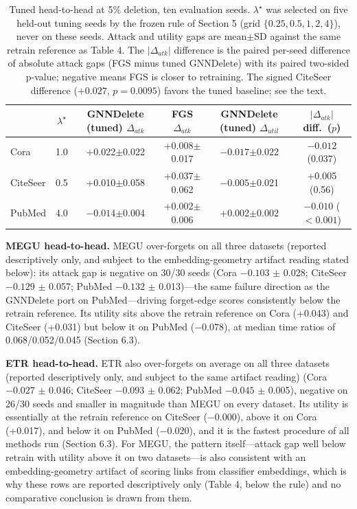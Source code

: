 \documentclass[pdflatex,sn-basic,Numbered]{sn-jnl}
\begin{document}
\begin{table}[htbp]\centering\scriptsize\setlength{\tabcolsep}{3pt}
\caption{Tuned head-to-head at 5\% deletion, ten evaluation seeds. $\lambda^\star$ was selected on five held-out tuning seeds by the frozen rule of Section 5 (grid $\{0.25, 0.5, 1, 2, 4\}$), never on these seeds. Attack and utility gaps are mean$\pm$SD against the same retrain reference as Table 4. The $|\Delta_{atk}|$ difference is the paired per-seed difference of absolute attack gaps (FGS minus tuned GNNDelete) with its paired two-sided p-value; negative means FGS is closer to retraining. The signed CiteSeer difference ($+0.027$, $p = 0.0095$) favors the tuned baseline; see the text.}
\begin{tabular}{lccccc}\toprule & $\lambda^\star$ & GNNDelete (tuned) $\Delta_{atk}$ & FGS $\Delta_{atk}$ & GNNDelete (tuned) $\Delta_{util}$ & $|\Delta_{atk}|$ diff.\ ($p$)\\\midrule
Cora & 1.0 & +0.022$\pm$0.022 & +0.008$\pm$0.017 & $-0.017$$\pm$0.022 & $-0.012$ (0.037)\\
CiteSeer & 0.5 & +0.010$\pm$0.058 & +0.037$\pm$0.062 & $-0.005$$\pm$0.021 & +0.005 (0.56)\\
PubMed & 4.0 & $-0.014$$\pm$0.004 & +0.002$\pm$0.006 & +0.002$\pm$0.002 & $-0.010$ ($<0.001$)\\\bottomrule
\end{tabular}\end{table}

\textbf{MEGU head-to-head.} MEGU over-forgets on all three datasets (reported descriptively only, and subject to the embedding-geometry artifact reading stated below): its attack gap is negative on 30/30 seeds (Cora $-0.103$ $\pm$ 0.028; CiteSeer $-0.129$ $\pm$ 0.057; PubMed $-0.132$ $\pm$ 0.013)---the same failure direction as the GNNDelete port on PubMed---driving forget-edge scores consistently below the retrain reference. Its utility sits above the retrain reference on Cora (+0.043) and CiteSeer (+0.031) but below it on PubMed ($-0.078$), at median time ratios of 0.068/0.052/0.045 (Section 6.3).

\textbf{ETR head-to-head.} ETR also over-forgets on average on all three datasets (reported descriptively only, and subject to the same artifact reading) (Cora $-0.027$ $\pm$ 0.046; CiteSeer $-0.093$ $\pm$ 0.062; PubMed $-0.045$ $\pm$ 0.005), negative on 26/30 seeds and smaller in magnitude than MEGU on every dataset. Its utility is essentially at the retrain reference on CiteSeer ($-0.000$), above it on Cora (+0.017), and below it on PubMed ($-0.020$), and it is the fastest procedure of all methods run (Section 6.3). For MEGU, the pattern itself---attack gap well below retrain with utility above it on two datasets---is also consistent with an embedding-geometry artifact of scoring links from classifier embeddings, which is why these rows are reported descriptively only (Table 4, below the rule) and no comparative conclusion is drawn from them.
\end{document}
